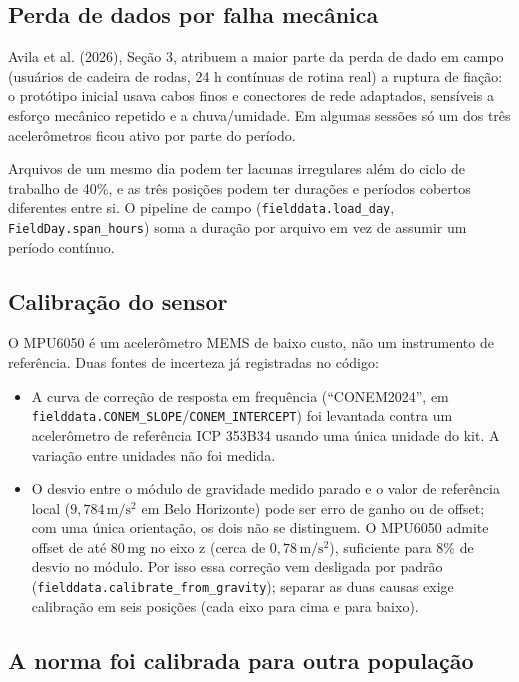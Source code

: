 \documentclass[11pt,a4paper]{article}
\newcommand{\code}[1]{\texttt{\small #1}}
\newcommand{\unit}[2]{\ensuremath{#1\,\mathrm{#2}}}
\begin{document}
\subsection{Perda de dados por falha mecânica}
\label{sec:loss}

Avila et al. (2026), Seção 3, atribuem a maior parte da perda de dado em
campo (usuários de cadeira de rodas, 24 h contínuas de rotina real) a
ruptura de fiação: o protótipo inicial usava cabos finos e conectores de
rede adaptados, sensíveis a esforço mecânico repetido e a chuva/umidade.
Em algumas sessões só um dos três acelerômetros ficou ativo por parte do
período.

Arquivos de um mesmo dia podem ter lacunas irregulares além do ciclo de
trabalho de 40\%, e as três posições podem ter durações e períodos
cobertos diferentes entre si. O pipeline de campo
(\code{fielddata.load\_day}, \code{FieldDay.span\_hours}) soma a duração
por arquivo em vez de assumir um período contínuo.

\subsection{Calibração do sensor}
\label{sec:calib}

O MPU6050 é um acelerômetro MEMS de baixo custo, não um instrumento de
referência. Duas fontes de incerteza já registradas no código:

\begin{itemize}
\item A curva de correção de resposta em frequência (``CONEM2024'', em
\code{fielddata.CONEM\_SLOPE}/\code{CONEM\_INTERCEPT}) foi levantada
contra um acelerômetro de referência ICP 353B34 usando uma única unidade
do kit. A variação entre unidades não foi medida.
\item O desvio entre o módulo de gravidade medido parado e o valor de
referência local (\unit{9{,}784}{m/s^2} em Belo Horizonte) pode ser erro
de ganho ou de offset; com uma única orientação, os dois não se
distinguem. O MPU6050 admite offset de até \unit{80}{mg} no eixo z
(cerca de \unit{0{,}78}{m/s^2}), suficiente para 8\% de desvio no módulo.
Por isso essa correção vem desligada por padrão
(\code{fielddata.calibrate\_from\_gravity}); separar as duas causas exige
calibração em seis posições (cada eixo para cima e para baixo).
\end{itemize}

\subsection{A norma foi calibrada para outra população}
\label{sec:populacao}
\end{document}
